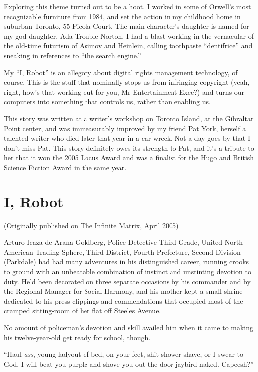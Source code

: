 Exploring this theme turned out to be a hoot. I worked in some of
Orwell’s most recognizable furniture from 1984, and set the action
in my childhood home in suburban Toronto, 55 Picola Court. The main
character’s daughter is named for my god-daughter, Ada Trouble
Norton. I had a blast working in the vernacular of the old-time
futurism of Asimov and Heinlein, calling toothpaste “dentifrice”
and sneaking in references to “the search engine.”

My “I, Robot” is an allegory about digital rights management
technology, of course. This is the stuff that nominally stops us
from infringing copyright (yeah, right, how’s that working out for
you, Mr Entertainment Exec?) and turns our computers into something
that controls us, rather than enabling us.

This story was written at a writer’s workshop on Toronto Island, at
the Gibraltar Point center, and was immeasurably improved by my
friend Pat York, herself a talented writer who died later that year
in a car wreck. Not a day goes by that I don’t miss Pat. This story
definitely owes its strength to Pat, and it’s a tribute to her that
it won the 2005 Locus Award and was a finalist for the Hugo and
British Science Fiction Award in the same year.

\section{I, Robot}

(Originally published on The Infinite Matrix, April 2005)

Arturo Icaza de Arana-Goldberg, Police Detective Third Grade,
United North American Trading Sphere, Third District, Fourth
Prefecture, Second Division (Parkdale) had had many adventures in
his distinguished career, running crooks to ground with an
unbeatable combination of instinct and unstinting devotion to duty.
He’d been decorated on three separate occasions by his commander
and by the Regional Manager for Social Harmony, and his mother kept
a small shrine dedicated to his press clippings and commendations
that occupied most of the cramped sitting-room of her flat off
Steeles Avenue.

No amount of policeman’s devotion and skill availed him when it
came to making his twelve-year-old get ready for school, though.

“Haul \emph{ass}, young lady{\dash}out of bed, on your feet,
shit-shower-shave, or I swear to God, I will beat you purple and
shove you out the door jaybird naked. Capeesh?”

